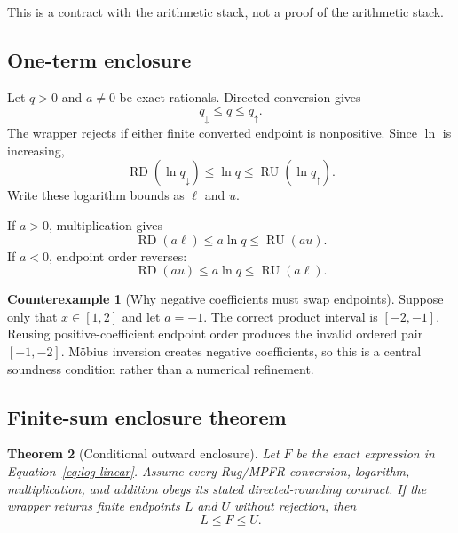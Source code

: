 \documentclass[11pt]{article}
\newtheorem{theorem}{Theorem}[section]
\theoremstyle{definition}
\newtheorem{counterexample}[theorem]{Counterexample}
\newcommand{\Rdown}{\operatorname{RD}}
\newcommand{\Rup}{\operatorname{RU}}
\begin{document}
This is a contract with the arithmetic stack, not a proof of the arithmetic stack.

\subsection{One-term enclosure}

Let $q>0$ and $a\ne0$ be exact rationals.  Directed conversion gives
\begin{equation}
  q_\downarrow\le q\le q_\uparrow.
\end{equation}
The wrapper rejects if either finite converted endpoint is nonpositive.  Since $\ln$ is increasing,
\begin{equation}
  \Rdown(\ln q_\downarrow)
  \le \ln q
  \le
  \Rup(\ln q_\uparrow).
\end{equation}
Write these logarithm bounds as $\ell$ and $u$.

If $a>0$, multiplication gives
\begin{equation}
  \Rdown(a\ell)\le a\ln q\le\Rup(au).
\end{equation}
If $a<0$, endpoint order reverses:
\begin{equation}
  \Rdown(au)\le a\ln q\le\Rup(a\ell).
\end{equation}

\begin{counterexample}[Why negative coefficients must swap endpoints]\label{cex:negative}
Suppose only that $x\in[1,2]$ and let $a=-1$.  The correct product interval is
$[-2,-1]$.  Reusing positive-coefficient endpoint order produces the invalid ordered pair
$[-1,-2]$.  M{\"o}bius inversion creates negative coefficients, so this is a central soundness
condition rather than a numerical refinement.
\end{counterexample}

\subsection{Finite-sum enclosure theorem}

\begin{theorem}[Conditional outward enclosure]\label{thm:enclosure}
Let $F$ be the exact expression in Equation~\eqref{eq:log-linear}.  Assume every Rug/MPFR
conversion, logarithm, multiplication, and addition obeys its stated directed-rounding contract.
If the wrapper returns finite endpoints $L$ and $U$ without rejection, then
\begin{equation}
  L\le F\le U.
\end{equation}
\end{theorem}
\end{document}
